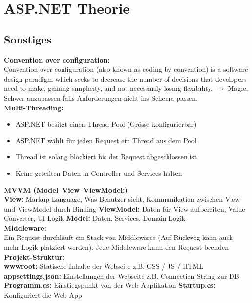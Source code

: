 \section{ASP.NET Theorie}
\subsection{Sonstiges}
\textcolor{b}{\textbf{Convention over configuration:}}\\
Convention over configuration (also known as coding by convention) is a software design paradigm which seeks to decrease the number of decisions that developers need to make, gaining simplicity, and not necessarily losing flexibility. $\rightarrow$ Magie, Schwer anzupassen falls Anforderungen nicht ins Schema passen.\\
\textcolor{b}{\textbf{Multi-Threading:}}
\begin{itemize}[topsep=0pt, leftmargin=3mm]
  \setlength\itemsep{-0.3em}
  \item ASP.NET besitzt einen Thread Pool (Grösse konfigurierbar)
  \item ASP.NET wählt für jeden Request ein Thread aus dem Pool
  \item Thread ist solang blockiert bis der Request abgeschlossen ist
  \item Keine geteilten Daten in Controller und Services halten
\end{itemize}
\textcolor{b}{\textbf{MVVM (Model–View–ViewModel:)}}\\
\textbf{View:} Markup Language, Was Benutzer sieht, Kommunikation zwischen View und ViewModel durch Binding
\textbf{ViewModel:} Daten für View aufbereiten, Value Converter, UI Logik
\textbf{Model:} Daten, Services, Domain Logik\\
\textcolor{b}{\textbf{Middleware:}}\\
Ein Request durchläuft ein Stack von Middlewares (Auf Rückweg kann auch mehr Logik platziert werden). Jede Middleware kann den Request beenden\\
\textcolor{b}{\textbf{Projekt-Struktur:}}\\
\textbf{wwwroot:} Statische Inhalte der Webseite z.B. CSS / JS / HTML
\textbf{appsettings.json:} Einstellungen der Webseite z.B. Connection-String zur DB
\textbf{Programm.cs:} Einstiegspunkt von der Web Applikation
\textbf{Startup.cs:} Konfiguriert die Web App
